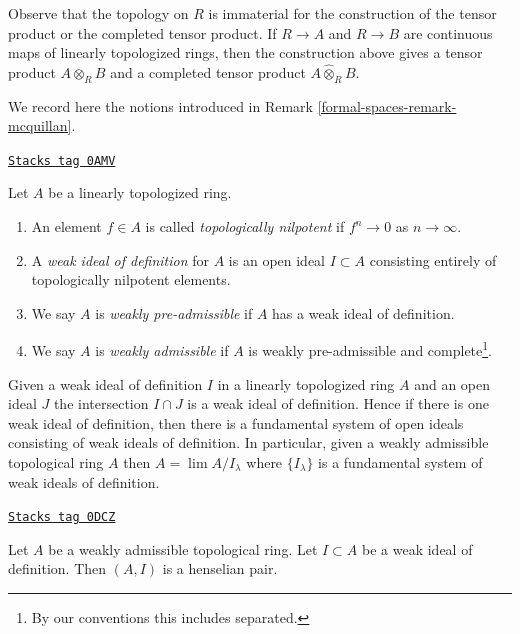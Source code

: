 Observe that the topology on $R$ is immaterial for the construction
of the tensor product or the completed tensor product.
If $R \to A$ and $R \to B$ are continuous maps of
linearly topologized rings, then the construction above
gives a tensor product $A \otimes_R B$ and a completed
tensor product $A \widehat{\otimes}_R B$.

\medskip\noindent
We record here the notions introduced in Remark \ref{formal-spaces-remark-mcquillan}.

\begin{definition}
\label{formal-spaces-definition-weakly-admissible}
\href{https://stacks.math.columbia.edu/tag/0AMV}{\texttt{Stacks tag 0AMV}}

Let $A$ be a linearly topologized ring.
\begin{enumerate}
\item An element $f \in A$ is called {\it topologically nilpotent}
if $f^n \to 0$ as $n \to \infty$.
\item A {\it weak ideal of definition} for $A$ is an open ideal
$I \subset A$ consisting entirely of topologically nilpotent elements.
\item We say $A$ is {\it weakly pre-admissible} if $A$ has a weak
ideal of definition.
\item We say $A$ is {\it weakly admissible} if $A$ is weakly pre-admissible
and complete\footnote{By our conventions this includes separated.}.
\end{enumerate}
\end{definition}

Given a weak ideal of definition $I$ in a linearly topologized ring
$A$ and an open ideal $J$ the intersection $I \cap J$ is a
weak ideal of definition. Hence if there is one weak ideal of definition,
then there is a fundamental system of open ideals
consisting of weak ideals of definition. In particular,
given a weakly admissible topological ring $A$ then
$A = \lim A/I_\lambda$ where $\{I_\lambda\}$ is a fundamental system
of weak ideals of definition.

\begin{lemma}
\label{formal-spaces-lemma-weakly-admissible-henselian}
\href{https://stacks.math.columbia.edu/tag/0DCZ}{\texttt{Stacks tag 0DCZ}}

Let $A$ be a weakly admissible topological ring. Let $I \subset A$
be a weak ideal of definition. Then $(A, I)$ is a henselian pair.
\end{lemma}

